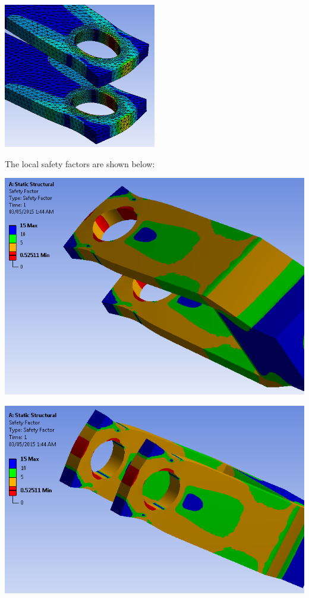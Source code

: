 \documentclass[a4paper,14pt]{extarticle}
\begin{document}
\begin{center}\includegraphics[width=0.5\textwidth]{LOCAL_STRESS.PNG}\end{center}

The local safety factors are shown below:

\includegraphics[width=\textwidth]{SF_1.PNG}

\includegraphics[width=\textwidth]{SF_2.PNG}
\end{document}
